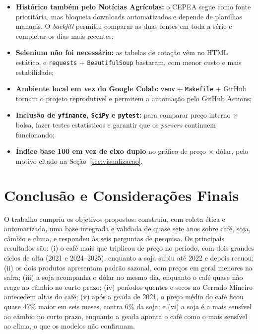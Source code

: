 \documentclass[conference]{IEEEtran}
\begin{document}
\begin{itemize}
  \item \textbf{Histórico também pelo Notícias Agrícolas:} o CEPEA segue como fonte prioritária, mas bloqueia
  downloads automatizados e depende de planilhas manuais. O \emph{backfill} permitiu comparar as duas fontes
  em toda a série e completar os dias mais recentes;
  \item \textbf{Selenium não foi necessário:} as tabelas de cotação vêm no HTML estático, e
  \texttt{requests} + \texttt{BeautifulSoup} bastaram, com menor custo e mais estabilidade;
  \item \textbf{Ambiente local em vez do Google Colab:} \texttt{venv} + \texttt{Makefile} + GitHub tornam
  o projeto reprodutível e permitem a automação pelo GitHub Actions;
  \item \textbf{Inclusão de \texttt{yfinance}, \texttt{SciPy} e \texttt{pytest}:} para
  comparar preço interno $\times$ bolsa, fazer testes estatísticos e garantir que os \emph{parsers}
  continuem funcionando;
  \item \textbf{Índice base 100 em vez de eixo duplo} no gráfico de preço $\times$ dólar, pelo motivo citado
  na Seção~\ref{sec:visualizacao}.
\end{itemize}

\section{Conclusão e Considerações Finais}

O trabalho cumpriu os objetivos propostos: construiu, com coleta ética e automatizada, uma base
integrada e validada de quase sete anos sobre café, soja, câmbio e clima, e respondeu às seis perguntas de
pesquisa. Os principais resultados são: (i) o café mais que triplicou de preço no período, com dois grandes
ciclos de alta (2021 e 2024--2025), enquanto a soja subiu até 2022 e depois recuou; (ii) os dois produtos
apresentam padrão sazonal, com preços em geral menores na safra; (iii) a soja acompanha o dólar no
mesmo dia, enquanto o café quase não reage ao câmbio no curto prazo; (iv) períodos quentes e secos no
Cerrado Mineiro antecedem altas do café; (v) após a geada de 2021, o preço médio do café ficou quase 47\% maior em seis meses, contra 6\% da soja; e (vi) a soja é a mais sensível ao câmbio no curto prazo, enquanto a geada aponta o café como o mais sensível ao clima, o que os modelos não confirmam.
\end{document}

